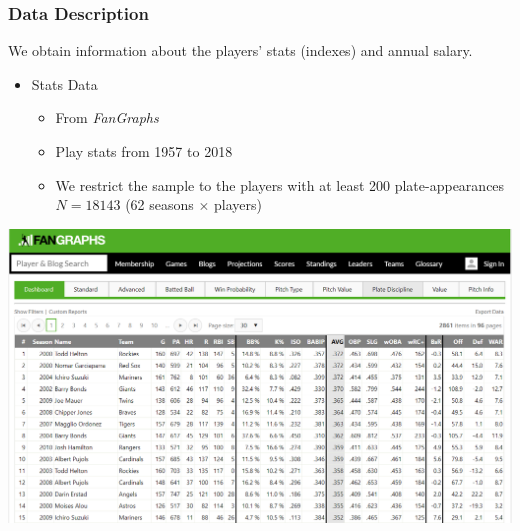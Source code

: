 \documentclass[dvipdfmx,12pt]{beamer}
\begin{document}
\begin{frame}\frametitle{Data Description}
  We obtain information about the players' stats (indexes) and annual salary.
  \begin{itemize}
    \item Stats Data
    \begin{itemize}
      \item From \textit{FanGraphs}

      \item Play stats from 1957 to 2018

      \item We restrict the sample to the players with at least 200 plate-appearances $N=18143$ (62 seasons $\times$ players)
    \end{itemize}
  \end{itemize}
  \begin{center}
    \includegraphics[keepaspectratio, scale=.25]{output/FanGraphs_2.png}
  \end{center}
\end{frame}
\end{document}
